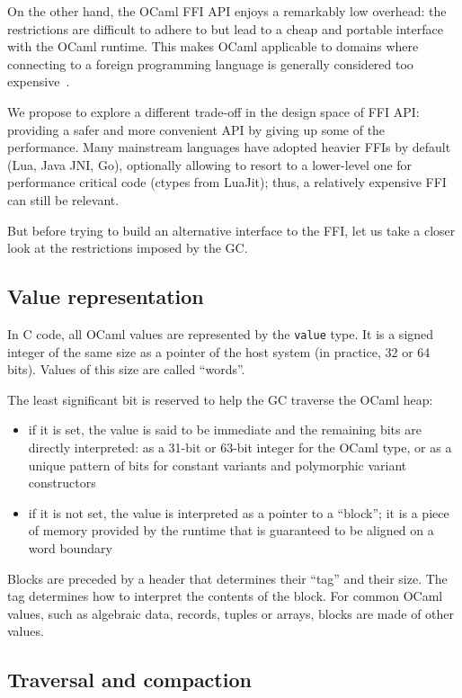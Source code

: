 \documentclass[a4paper]{easychair}
\newcommand{\caml}[1]{\smash{\lstinline{#1}}}
\newcommand{\cpp}[1]{\lstinline[style=C++]{#1}}
\begin{document}
On the other hand, the OCaml FFI API enjoys a remarkably low overhead:
the restrictions are difficult to adhere to but lead to a cheap and portable
interface with the OCaml runtime. This makes OCaml applicable to domains
where connecting to a foreign programming language is generally
considered too expensive~\citep{bourke:hal-01408230}.

We propose to explore a different trade-off in the design space of FFI
API: providing a safer and more convenient API by giving up some of the
performance.  Many mainstream languages have adopted heavier FFIs by default
(Lua, Java JNI, Go), optionally allowing to resort to a lower-level one
for performance critical code (ctypes from LuaJit); thus, a relatively
expensive FFI can still be relevant.

But before trying to build an alternative interface to the FFI, let us take a
closer look at the restrictions imposed by the GC.

\subsection{Value representation}

In C code, all OCaml values are represented by the \cpp{value} type. It is a
signed integer of the same size as a pointer of the host system (in practice,
32 or 64 bits). Values of this size are called ``words''.

The least significant bit is reserved to help the GC traverse the OCaml
heap:
%
\begin{itemize}
\item if it is set, the value is said to be immediate and the remaining bits
      are directly interpreted: as a 31-bit or 63-bit integer for the
      \caml{int} OCaml type, or as a unique pattern of bits for constant
      variants and polymorphic variant constructors
\item if it is not set, the value is interpreted as a pointer to a
      ``block''; it is a piece of memory provided by the runtime that is
      guaranteed to be aligned on a word boundary
\end{itemize}

Blocks are preceded by a header that determines their ``tag'' and their
size. The tag determines how to interpret the contents of the block.
For common OCaml values, such as algebraic data, records, tuples or
arrays, blocks are made of other values.

\subsection{Traversal and compaction}
\end{document}
